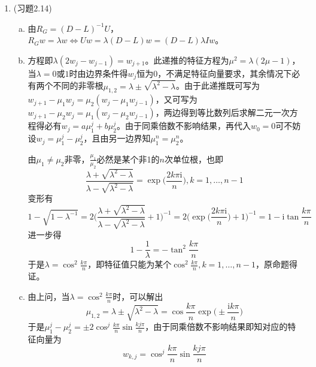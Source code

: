 \documentclass[a4paper,UTF8,fontset=windows]{ctexart}
\begin{document}
\begin{enumerate}
    \item (习题2.14)
    \begin{enumerate}[(a)]
    \item 
    由$R_G=(D-L)^{-1}U$，$R_Gw=\lambda w\Leftrightarrow Uw=\lambda(D-L)w=(D-L)\lambda Iw$。
    
    \item
    方程即$\lambda(2w_j-w_{j-1})=w_{j+1}$。此递推的特征方程为$\mu^2=\lambda(2\mu-1)$，当$\lambda=0$或$1$时由边界条件得$w_j$恒为$0$，不满足特征向量要求，其余情况下必有两个不同的非零根$\mu_{1,2}=\lambda\pm\sqrt{\lambda^2-\lambda}$。由于此递推既可写为$w_{j+1}-\mu_1w_j=\mu_2(w_j-\mu_1w_{j-1})$，又可写为$w_{j+1}-\mu_2w_j=\mu_1(w_j-\mu_2w_{j-1})$，两边得到等比数列后求解二元一次方程得必有$w_j=a\mu_1^j+b\mu_2^j$。由于同乘倍数不影响结果，再代入$w_0=0$可不妨设$w_j=\mu_1^j-\mu_2^j$，且由另一边界知$\mu_1^n=\mu_2^n$。
    
    由$\mu_1\ne\mu_2$非零，$\frac{\mu_1}{\mu_2}$必然是某个非1的$n$次单位根，也即
    $$\frac{\lambda+\sqrt{\lambda^2-\lambda}}{\lambda-\sqrt{\lambda^2-\lambda}}=\exp\bigg(\frac{2k\pi\mathrm{i}}{n}\bigg),k=1,\dots,n-1$$
    变形有
    $$1-\sqrt{1-\lambda^{-1}}=2\bigg(\frac{\lambda+\sqrt{\lambda^2-\lambda}}{\lambda-\sqrt{\lambda^2-\lambda}}+1\bigg)^{-1}=2\bigg(\exp\bigg(\frac{2k\pi\mathrm{i}}{n}\bigg)+1\bigg)^{-1}=1-\mathrm{i}\tan\frac{k\pi}{n}$$
    进一步得
    $$1-\frac{1}{\lambda}=-\tan^2\frac{k\pi}{n}$$
    于是$\lambda=\cos^2\frac{k\pi}{n}$，即特征值只能为某个$\cos^2\frac{k\pi}{n},k=1,\dots,n-1$，原命题得证。
    
    \item
    由上问，当$\lambda=\cos^2\frac{k\pi}{n}$时，可以解出
    $$\mu_{1,2}=\lambda\pm\sqrt{\lambda^2-\lambda}=\cos\frac{k\pi}{n}\exp\bigg(\pm\frac{\mathrm{i}k\pi}{n}\bigg)$$
    于是$\mu_1^j-\mu_2^j=\pm2\cos^j\frac{k\pi}{n}\sin\frac{kj\pi}{n}$，由于同乘倍数不影响结果即知对应的特征向量为
    $$w_{k,j}=\cos^j\frac{k\pi}{n}\sin\frac{kj\pi}{n}$$
    \end{enumerate}
\end{enumerate}
\end{document}
